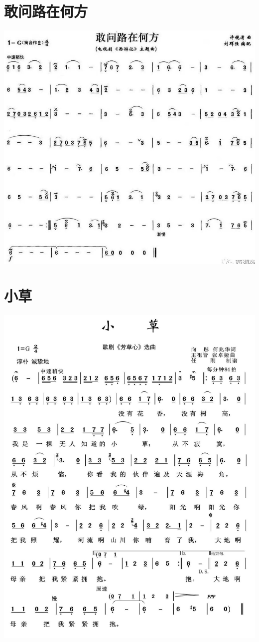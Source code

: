 \documentclass[cn,pad,twocol]{elegantbook}
\begin{document}
\section{敢问路在何方}  \includegraphics[width=\textwidth]{dongxiao/20200819/西游记-敢问路在何方.jpeg}
\section{小草}                  \includegraphics[width=\textwidth]{rpi400/20210131小草.jpeg}
\end{document}
